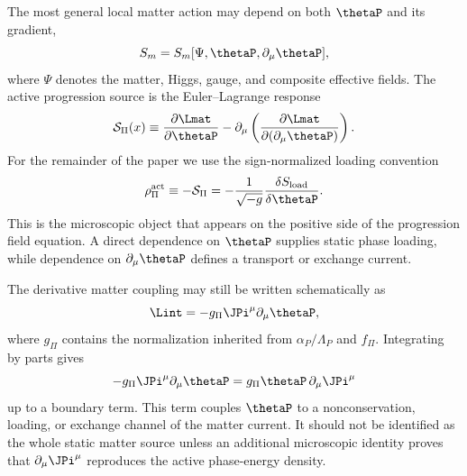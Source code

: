 \documentclass[12pt]{article}
\begin{document}
The most general local matter action may depend on both \(\thetaP\) and its gradient,
\begin{equation}
    S_m=S_m[\Psi,\thetaP,\partial_\mu\thetaP],
    \label{eq:general-matter-theta-action}
\end{equation}
where \(\Psi\) denotes the matter, Higgs, gauge, and composite effective fields.  The active progression source is the Euler--Lagrange response
\begin{equation}
    \mathcal S_\Pi(x)
    \equiv
    \frac{\partial \Lmat}{\partial\thetaP}
    -\partial_\mu\left(
    \frac{\partial \Lmat}{\partial(\partial_\mu\thetaP)}
    \right).
    \label{eq:full-EL-source}
\end{equation}
For the remainder of the paper we use the sign-normalized loading convention
\begin{equation}
    \rho_\Pi^{\rm act}\equiv-\mathcal S_\Pi
    =-\frac{1}{\sqrt{-g}}\frac{\delta S_{\rm load}}{\delta\thetaP}.
    \label{eq:positive-active-loading}
\end{equation}
This is the microscopic object that appears on the positive side of the progression field equation.  A direct dependence on \(\thetaP\) supplies static phase loading, while dependence on \(\partial_\mu\thetaP\) defines a transport or exchange current.

The derivative matter coupling may still be written schematically as
\begin{equation}
    \Lint = -g_\Pi \JPi^\mu \partial_\mu \thetaP,
    \label{eq:derivative-coupling-theta}
\end{equation}
where \(g_\Pi\) contains the normalization inherited from \(\alpha_P/\Lambda_P\) and \(f_\Pi\). Integrating by parts gives
\begin{equation}
    -g_\Pi \JPi^\mu \partial_\mu\thetaP
    = g_\Pi \thetaP\,\partial_\mu \JPi^\mu
    \label{eq:integrate-parts}
\end{equation}
up to a boundary term. This term couples \(\thetaP\) to a nonconservation, loading, or exchange channel of the matter current. It should not be identified as the whole static matter source unless an additional microscopic identity proves that \(\partial_\mu\JPi^\mu\) reproduces the active phase-energy density.
\end{document}
